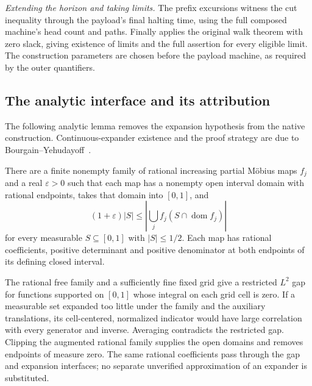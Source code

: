 \begin{proofoutline}
\emph{Extending the horizon and taking limits.} The prefix excursions witness
the cut inequality through the payload's final halting time, using the full
composed machine's head count and paths. Finally
 applies the original walk theorem with zero
slack, giving existence of limits and the full assertion for every eligible
limit. The construction parameters are chosen before the payload machine,
as required by the outer quantifiers.
\end{proofoutline}

\subsection{The analytic interface and its attribution}

The following analytic lemma removes the expansion hypothesis from the native
construction. Continuous-expander existence and the proof strategy are due
to Bourgain--Yehudayoff~\cite{BourgainYehudayoff2013}.

\begin{lemma}\label{lem:rational-expander}
There are a finite nonempty family of rational increasing partial M\"obius
maps $f_j$ and a real $\varepsilon>0$ such that each map has a nonempty open
interval domain with rational endpoints, takes that domain into $[0,1]$, and
\[
 (1+\varepsilon)|S|\le
 \left|\bigcup_j f_j(S\cap\operatorname{dom}f_j)\right|
\]
for every measurable $S\subseteq[0,1]$ with $|S|\le1/2$.
Each map has rational coefficients, positive determinant and positive
denominator at both endpoints of its defining closed interval.
\end{lemma}

\begin{proofoutline}
The rational free family and a sufficiently fine fixed grid give a restricted
$L^2$ gap for functions supported on $[0,1]$ whose integral on each grid cell
is zero. If a measurable set expanded too little under the family and the
auxiliary translations, its cell-centered, normalized indicator would have
large correlation with every generator and inverse. Averaging contradicts
the restricted gap. Clipping the augmented rational family supplies the
open domains and removes endpoints of measure zero. The same rational
coefficients pass through the gap and expansion interfaces; no separate
unverified approximation of an expander is substituted.
\end{proofoutline}

